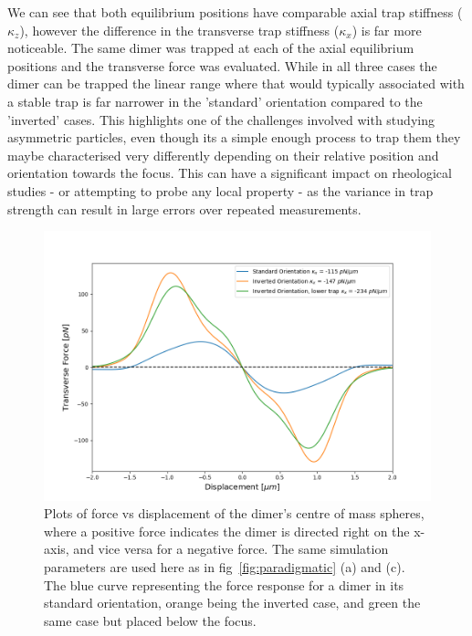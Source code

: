 We can see that both equilibrium positions have comparable 
axial trap stiffness ($\kappa_z$), however the difference 
in the transverse trap stiffness ($\kappa_x$) is far more 
noticeable. The same dimer was trapped at each of the axial 
equilibrium positions and the transverse force was evaluated. 
While in all three cases the dimer can be trapped the linear
range where that would typically associated with a stable 
trap is far narrower in the 'standard' orientation compared 
to the 'inverted' cases. This highlights one of the challenges 
involved with studying asymmetric particles, even though its 
a simple enough process to trap them they maybe characterised 
very differently depending on their relative position and 
orientation towards the focus. This can have a significant 
impact on rheological studies - or attempting to probe any 
local property - as the variance in trap strength can result 
in large errors over repeated measurements. 
\begin{figure}[h!]
	\centering
	\includegraphics[width=\linewidth]{transverse_force.png}
	\caption{Plots of force vs displacement of the dimer's 
		centre of mass spheres, where a positive force 
		indicates the dimer is directed right on the x-axis, 
		and vice versa for a negative force. The same simulation 
		parameters are used here as in fig~\ref{fig:paradigmatic}
		(a) and (c). The blue curve representing the force 
		response for a dimer in its standard orientation, orange 
		being the inverted case, and green the same case but 
		placed below the focus.}
	\label{fig:transverse_force}
\end{figure}


